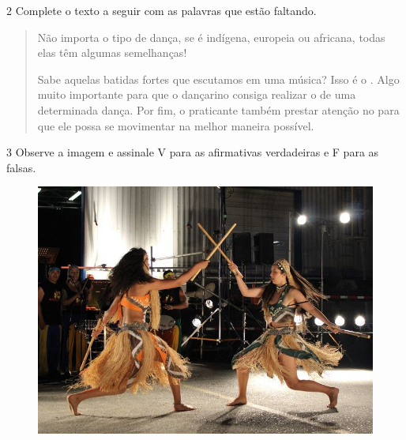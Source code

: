 
\num{2} Complete o texto a seguir com as palavras que estão faltando.

\begin{quote}
Não importa o tipo de dança, se é indígena, europeia ou africana, todas
elas têm algumas semelhanças!

Sabe aquelas batidas fortes que escutamos em uma música? Isso é o \preencher{}.
Algo muito importante para que o dançarino consiga realizar o \preencher{} de
uma determinada dança. Por fim, o praticante também prestar atenção no
\preencher{} para que ele possa se movimentar na melhor maneira possível.
\end{quote}


\num{3} Observe a imagem e assinale V para as afirmativas verdadeiras e F para as falsas.

\begin{figure}[htpb!]
\includegraphics[width=\textwidth]{./imgs/img12.jpg}
\end{figure}

